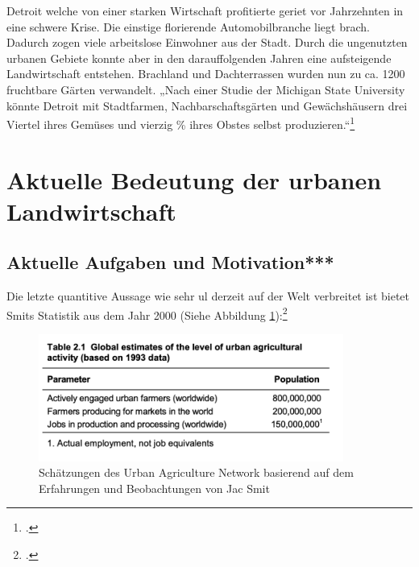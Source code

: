\documentclass{scrartcl}
\begin{document}
Detroit welche von einer starken Wirtschaft profitierte geriet vor Jahrzehnten in eine schwere Krise. Die einstige florierende Automobilbranche liegt brach. Dadurch zogen viele arbeitslose Einwohner aus der Stadt. Durch die ungenutzten urbanen Gebiete konnte aber in den darauffolgenden Jahren eine aufsteigende Landwirtschaft entstehen. Brachland und Dachterrassen wurden nun zu ca. 1200 fruchtbare Gärten verwandelt. „Nach einer Studie der Michigan State University könnte Detroit mit Stadtfarmen, Nachbarschaftsgärten und Gewächshäusern drei Viertel ihres Gemüses und vierzig \% ihres Obstes selbst produzieren.“\footcite[Vgl.]{Sieg2016GemuseDetroit}


\section{Aktuelle Bedeutung der urbanen Landwirtschaft}
\subsection{Aktuelle Aufgaben und Motivation***}

Die letzte quantitive Aussage wie sehr \acs{ul} derzeit auf der Welt verbreitet ist bietet Smits Statistik aus dem Jahr 2000 (Siehe Abbildung \ref{fig:ulstatistics}):\footcite[Vgl.][S.1]{Smit2001UrbanToday}
\begin{figure}[htbp]
    \centering
    \includegraphics[width=10cm]{image_folder/800000ul.png}
  \caption{Schätzungen des Urban Agriculture Network basierend auf dem Erfahrungen und Beobachtungen von Jac Smit}
  \label{fig:ulstatistics}
\end{figure} 
\end{document}
